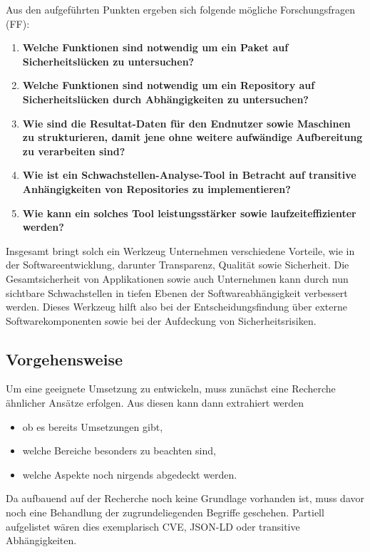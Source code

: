     Aus den aufgeführten Punkten ergeben sich folgende mögliche Forschungsfragen (FF):
    \begin{enumerate}[label=\textbf{FF-\Roman*}, leftmargin=1.75cm]
        \item \textbf{Welche Funktionen sind notwendig um ein Paket auf Sicherheitslücken zu untersuchen?}\label{q:one}
        \item \textbf{Welche Funktionen sind notwendig um ein Repository auf Sicherheitslücken durch Abhängigkeiten zu untersuchen?}\label{q:two}
        \item \textbf{Wie sind die Resultat-Daten für den Endnutzer sowie Maschinen zu strukturieren, damit jene ohne weitere aufwändige Aufbereitung zu verarbeiten sind?}\label{q:three}
        \item \textbf{Wie ist ein Schwachstellen-Analyse-Tool in Betracht auf transitive Anhängig\-keiten von Repositories zu implementieren?}\label{q:four}
        \item \textbf{Wie kann ein solches Tool leistungsstärker sowie laufzeiteffizienter werden?}\label{q:five}
    \end{enumerate}
    Insgesamt bringt solch ein Werkzeug Unternehmen verschiedene Vorteile, wie in der Softwareentwicklung, darunter Transparenz, Qualität sowie Sicherheit.
    Die Gesamtsicherheit von Applikationen sowie auch Unternehmen kann durch nun sichtbare Schwachstellen in tiefen Ebenen der Softwareabhängigkeit verbessert werden.
    Dieses Werkzeug hilft also bei der Entscheidungsfindung über externe Softwarekomponenten sowie bei der Aufdeckung von Sicherheitsrisiken.

    \subsection*{Vorgehensweise} \label{subsec:Vorgehensweise}
        Um eine geeignete Umsetzung zu entwickeln, muss zunächst eine Recherche ähnlicher Ansätze erfolgen.
        Aus diesen kann dann extrahiert werden
        \begin{itemize}
            \item ob es bereits Umsetzungen gibt,
            \item welche Bereiche besonders zu beachten sind,
            \item welche Aspekte noch nirgends abgedeckt werden.
        \end{itemize}
        Da aufbauend auf der Recherche noch keine Grundlage vorhanden ist, muss davor noch eine Behandlung der zugrundeliegenden Begriffe geschehen.
        Partiell aufgelistet wären dies exemplarisch \ac{CVE}, \ac{JSON-LD} oder transitive Abhängigkeiten.

